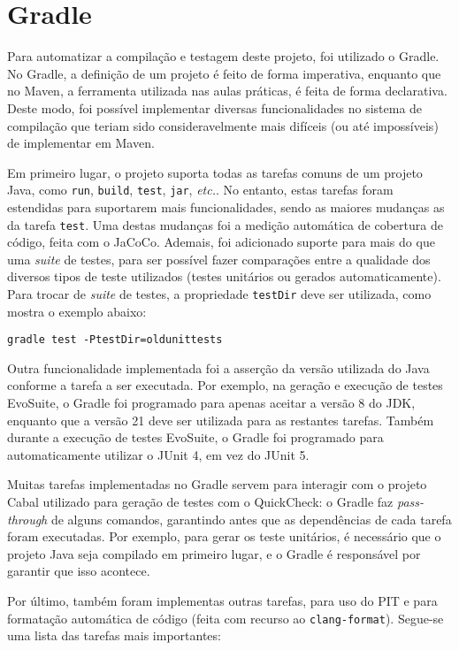 \documentclass[12pt, a4paper]{article}
\begin{document}
\section{Gradle}

Para automatizar a compilação e testagem deste projeto, foi utilizado o Gradle. No Gradle, a
definição de um projeto é feito de forma imperativa, enquanto que no Maven, a ferramenta utilizada
nas aulas práticas, é feita de forma declarativa. Deste modo, foi possível implementar diversas
funcionalidades no sistema de compilação que teriam sido consideravelmente mais difíceis (ou até
impossíveis) de implementar em Maven.

Em primeiro lugar, o projeto suporta todas as tarefas comuns de um projeto Java, como \texttt{run},
\texttt{build}, \texttt{test}, \texttt{jar}, \emph{etc.}. No entanto, estas tarefas foram estendidas
para suportarem mais funcionalidades, sendo as maiores mudanças as da tarefa \texttt{test}. Uma
destas mudanças foi a medição automática de cobertura de código, feita com o JaCoCo. Ademais, foi
adicionado suporte para mais do que uma \emph{suite} de testes, para ser possível fazer comparações
entre a qualidade dos diversos tipos de teste utilizados (testes unitários ou gerados
automaticamente). Para trocar de \emph{suite} de testes, a propriedade \texttt{testDir} deve ser
utilizada, como mostra o exemplo abaixo:

\begin{center}
    \texttt{gradle test -PtestDir=oldunittests}
\end{center}

Outra funcionalidade implementada foi a asserção da versão utilizada do Java conforme a tarefa a
ser executada. Por exemplo, na geração e execução de testes EvoSuite, o Gradle foi programado para
apenas aceitar a versão 8 do JDK, enquanto que a versão 21 deve ser utilizada para as restantes
tarefas. Também durante a execução de testes EvoSuite, o Gradle foi programado para automaticamente
utilizar o JUnit 4, em vez do JUnit 5.

Muitas tarefas implementadas no Gradle servem para interagir com o projeto Cabal utilizado para
geração de testes com o QuickCheck: o Gradle faz \emph{pass-through} de alguns comandos, garantindo
antes que as dependências de cada tarefa foram executadas. Por exemplo, para gerar os teste
unitários, é necessário que o projeto Java seja compilado em primeiro lugar, e o Gradle é
responsável por garantir que isso acontece.

Por último, também foram implementas outras tarefas, para uso do PIT e para formatação automática
de código (feita com recurso ao \texttt{clang-format}). Segue-se uma lista das tarefas mais
importantes:
\end{document}
